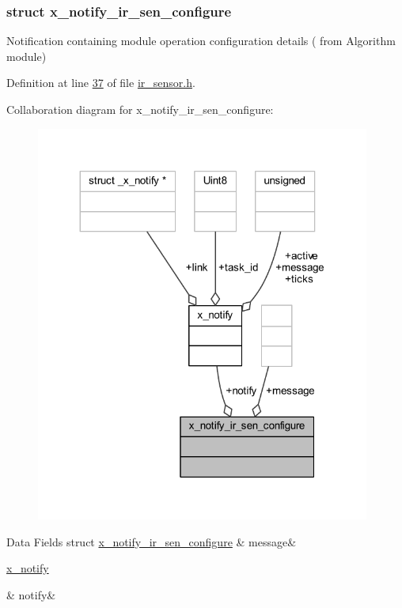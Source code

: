 \subsubsection{struct x\+\_\+notify\+\_\+ir\+\_\+sen\+\_\+configure}
Notification containing module operation configuration details ( from Algorithm module) 

Definition at line \hyperlink{a00017_source_l00037}{37} of file \hyperlink{a00017_source}{ir\+\_\+sensor.\+h}.



Collaboration diagram for x\+\_\+notify\+\_\+ir\+\_\+sen\+\_\+configure\+:\nopagebreak
\begin{figure}[H]
\begin{center}
\leavevmode
\includegraphics[width=311pt]{df/da5/a00912}
\end{center}
\end{figure}
\begin{DoxyFields}{Data Fields}
\hypertarget{a00017_a466ed85f7086376a698e191f74f9a0bc}{struct \hyperlink{a00017_db/deb/a00853}{x\+\_\+notify\+\_\+ir\+\_\+sen\+\_\+configure}}\label{a00017_a466ed85f7086376a698e191f74f9a0bc}
&
message&
\\
\hline

\hypertarget{a00017_a8e6a04c2283f9fd7b8dcbc62faba5847}{\hyperlink{a00036_df/d4c/a00851}{x\+\_\+notify}}\label{a00017_a8e6a04c2283f9fd7b8dcbc62faba5847}
&
notify&
\\
\hline

\end{DoxyFields}
\label{d6/d2f/a00854}
\hypertarget{a00017_d6/d2f/a00854}{}
